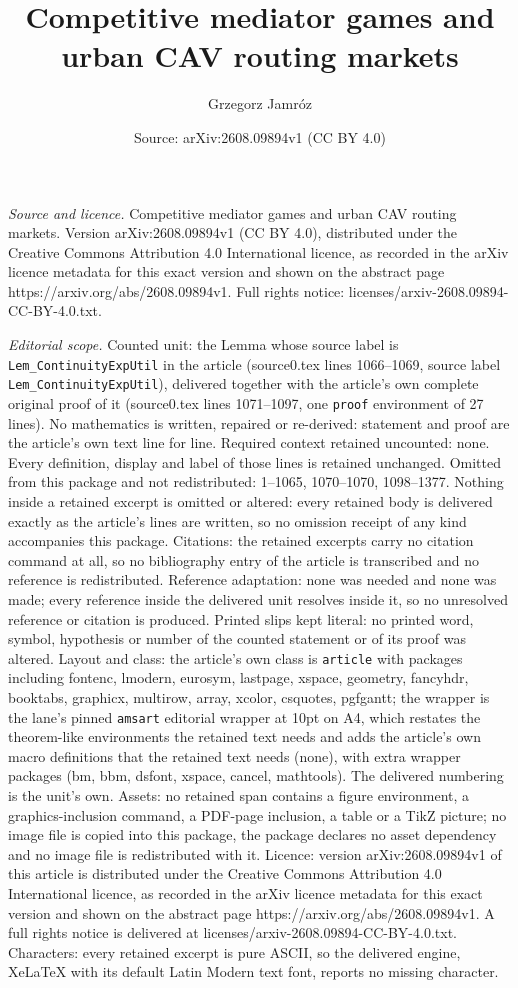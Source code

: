 \documentclass[10pt,a4paper]{amsart}
\title[Competitive mediator games and urban CAV routing markets]{Competitive mediator games and urban CAV routing markets}
\author{Grzegorz Jamr\'oz}
\date{Source: arXiv:2608.09894v1 (CC BY 4.0)}
\begin{document}
\maketitle

\noindent\emph{Source and licence.} Competitive mediator games and urban CAV routing markets. Version arXiv:2608.09894v1 (CC BY 4.0), distributed under the Creative Commons Attribution 4.0 International licence, as recorded in the arXiv licence metadata for this exact version and shown on the abstract page https://arxiv.org/abs/2608.09894v1. Full rights notice: licenses/arxiv-2608.09894-CC-BY-4.0.txt.\par\smallskip

\noindent\textit{Editorial scope.} Counted unit: the Lemma whose source label is \texttt{Lem\_ContinuityExpUtil} in the article (source0.tex lines 1066--1069, source label \texttt{Lem\_ContinuityExpUtil}), delivered together with the article's own complete original proof of it (source0.tex lines 1071--1097, one \texttt{proof} environment of 27 lines). No mathematics is written, repaired or re-derived: statement and proof are the article's own text line for line. Required context retained uncounted: none. Every definition, display and label of those lines is retained unchanged. Omitted from this package and not redistributed: 1--1065, 1070--1070, 1098--1377. Nothing inside a retained excerpt is omitted or altered: every retained body is delivered exactly as the article's lines are written, so no omission receipt of any kind accompanies this package. Citations: the retained excerpts carry no citation command at all, so no bibliography entry of the article is transcribed and no reference is redistributed. Reference adaptation: none was needed and none was made; every reference inside the delivered unit resolves inside it, so no unresolved reference or citation is produced. Printed slips kept literal: no printed word, symbol, hypothesis or number of the counted statement or of its proof was altered. Layout and class: the article's own class is \texttt{article} with packages including fontenc, lmodern, eurosym, lastpage, xspace, geometry, fancyhdr, booktabs, graphicx, multirow, array, xcolor, csquotes, pgfgantt; the wrapper is the lane's pinned \texttt{amsart} editorial wrapper at 10pt on A4, which restates the theorem-like environments the retained text needs and adds the article's own macro definitions that the retained text needs (none), with extra wrapper packages (bm, bbm, dsfont, xspace, cancel, mathtools). The delivered numbering is the unit's own. Assets: no retained span contains a figure environment, a graphics-inclusion command, a PDF-page inclusion, a table or a TikZ picture; no image file is copied into this package, the package declares no asset dependency and no image file is redistributed with it. Licence: version arXiv:2608.09894v1 of this article is distributed under the Creative Commons Attribution 4.0 International licence, as recorded in the arXiv licence metadata for this exact version and shown on the abstract page https://arxiv.org/abs/2608.09894v1. A full rights notice is delivered at licenses/arxiv-2608.09894-CC-BY-4.0.txt. Characters: every retained excerpt is pure ASCII, so the delivered engine, XeLaTeX with its default Latin Modern text font, reports no missing character.
\end{document}
